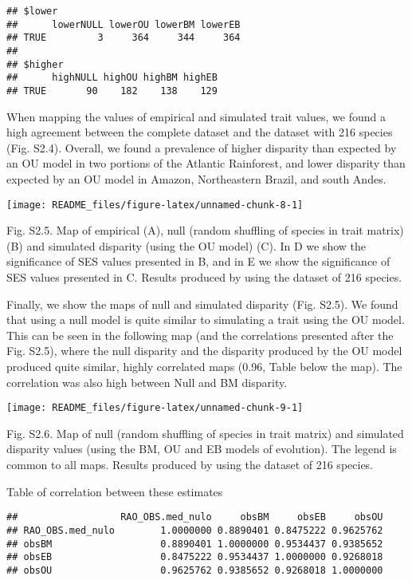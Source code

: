 \documentclass[
]{article}
\begin{document}
\begin{verbatim}
## $lower
##      lowerNULL lowerOU lowerBM lowerEB
## TRUE         3     364     344     364
## 
## $higher
##      highNULL highOU highBM highEB
## TRUE       90    182    138    129
\end{verbatim}

When mapping the values of empirical and simulated trait values, we
found a high agreement between the complete dataset and the dataset with
216 species (Fig. S2.4). Overall, we found a prevalence of higher
disparity than expected by an OU model in two portions of the Atlantic
Rainforest, and lower disparity than expected by an OU model in Amazon,
Northeastern Brazil, and south Andes.

\begin{center}\texttt{[image: README\_files/figure-latex/unnamed-chunk-8-1]} \end{center}

Fig. S2.5. Map of empirical (A), null (random shuffling of species in
trait matrix) (B) and simulated disparity (using the OU model) (C). In D
we show the significance of SES values presented in B, and in E we show
the significance of SES values presented in C. Results produced by using
the dataset of 216 species.

Finally, we show the maps of null and simulated disparity (Fig. S2.5).
We found that using a null model is quite similar to simulating a trait
using the OU model. This can be seen in the following map (and the
correlations presented after the Fig. S2.5), where the null disparity
and the disparity produced by the OU model produced quite similar,
highly correlated maps (0.96, Table below the map). The correlation was
also high between Null and BM disparity.

\begin{center}\texttt{[image: README\_files/figure-latex/unnamed-chunk-9-1]} \end{center}

Fig. S2.6. Map of null (random shuffling of species in trait matrix) and
simulated disparity values (using the BM, OU and EB models of
evolution). The legend is common to all maps. Results produced by using
the dataset of 216 species.

Table of correlation between these estimates

\begin{verbatim}
##                  RAO_OBS.med_nulo     obsBM     obsEB     obsOU
## RAO_OBS.med_nulo        1.0000000 0.8890401 0.8475222 0.9625762
## obsBM                   0.8890401 1.0000000 0.9534437 0.9385652
## obsEB                   0.8475222 0.9534437 1.0000000 0.9268018
## obsOU                   0.9625762 0.9385652 0.9268018 1.0000000
\end{verbatim}
\end{document}
